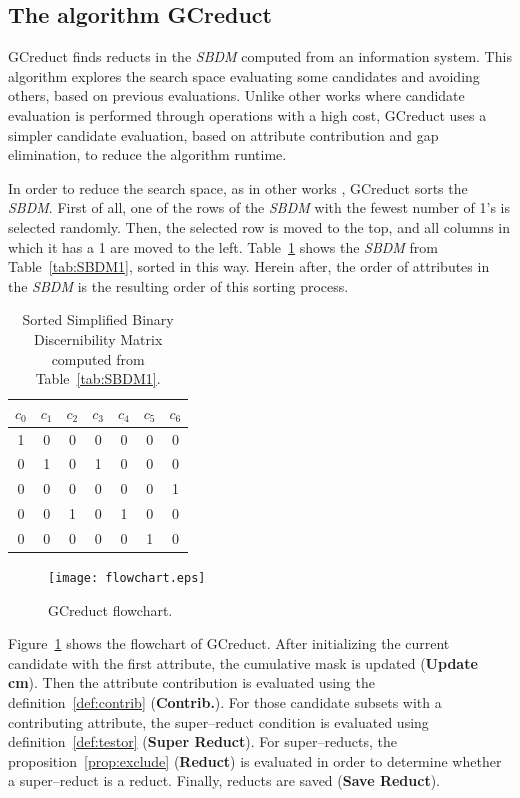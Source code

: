 \documentclass[number,preprint,review,12pt]{elsarticle}
\begin{document}
\subsection{The algorithm GCreduct}\label{description}
	GCreduct finds reducts in the \textit{SBDM} computed from an information system. This algorithm explores the search space evaluating some candidates and avoiding others, based on previous evaluations. Unlike other works \citep{WangP07,Lias13} where candidate evaluation is performed through operations with a high cost, GCreduct uses a simpler candidate evaluation, based on attribute contribution and gap elimination, to reduce the algorithm runtime. 

	In order to reduce the search space, as in other works \citep{Sanchez07,Lias13}, GCreduct sorts the \textit{SBDM}. First of all, one of the rows of the \textit{SBDM} with the fewest number of 1's is selected randomly. Then, the selected row is moved to the top, and all columns in which it has a 1 are moved to the left. Table~\ref{tab:SSBDM1} shows the \textit{SBDM} from Table~\ref{tab:SBDM1}, sorted in this way. Herein after, the order of attributes in the \textit{SBDM} is the resulting order of this sorting process.
		
	\begin{table}[htb]
		\caption{Sorted Simplified Binary Discernibility Matrix computed from Table~\ref{tab:SBDM1}.}
		\centering
		\begin{tabular}{ccccccc}\label{tab:SSBDM1}
			$c_0$ & $c_1$ & $c_2$ & $c_3$ & $c_4$ & $c_5$ & $c_6$\\
			\hline
			1&0&0&0&0&0&0\\
			0&1&0&1&0&0&0\\
			0&0&0&0&0&0&1\\
			0&0&1&0&1&0&0\\
			0&0&0&0&0&1&0\\
		\end{tabular}             
	\end{table}  
	
	\begin{figure}[htb]
		\begin{center}
			\texttt{[image: flowchart.eps]}
		\end{center}
		\caption{GCreduct flowchart.}
		\label{fig:flowchart}
	\end{figure}
	
	Figure~\ref{fig:flowchart} shows the flowchart of GCreduct. After initializing the current candidate with the first attribute, the cumulative mask is updated (\textbf{Update cm}). Then the attribute contribution is evaluated using the definition~\ref{def:contrib} (\textbf{Contrib.}). For those candidate subsets with a contributing attribute, the super--reduct condition is evaluated using definition~\ref{def:testor} (\textbf{Super Reduct}). For super--reducts, the proposition~\ref{prop:exclude} (\textbf{Reduct}) is evaluated in order to determine whether a super--reduct is a reduct. Finally, reducts are saved (\textbf{Save Reduct}).
	
\end{document}
